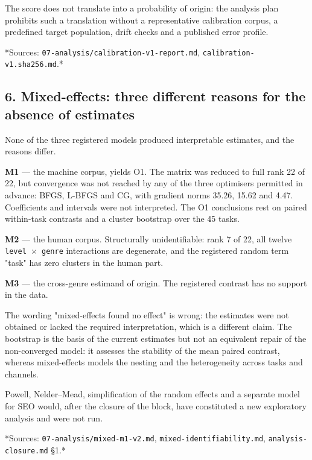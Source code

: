 \documentclass[11pt,a4paper]{article}
\renewcommand{\_}{\textunderscore\allowbreak}
\begin{document}
The score does not translate into a probability of origin: the analysis plan
prohibits such a translation without a representative calibration corpus, a
predefined target population, drift checks and a published error profile.

*Sources: \texttt{07-\allowbreak{}analysis/calibration-\allowbreak{}v1-\allowbreak{}report.md}, \texttt{calibration-\allowbreak{}v1.sha256.md}.*

\subsection{6. Mixed-effects: three different reasons for the absence of estimates}

None of the three registered models produced interpretable estimates, and the
reasons differ.

\textbf{M1} — the machine corpus, yields O1. The matrix was reduced to full rank 22
of 22, but convergence was not reached by any of the three optimisers
permitted in advance: BFGS, L-BFGS and CG, with gradient norms 35.26, 15.62
and 4.47. Coefficients and intervals were not interpreted. The O1 conclusions
rest on paired within-task contrasts and a cluster bootstrap over the 45
tasks.

\textbf{M2} — the human corpus. Structurally unidentifiable: rank 7 of 22, all
twelve \texttt{level $\times$ genre} interactions are degenerate, and the registered random
term "task" has zero clusters in the human part.

\textbf{M3} — the cross-genre estimand of origin. The registered contrast has no
support in the data.

The wording "mixed-effects found no effect" is wrong: the estimates were not
obtained or lacked the required interpretation, which is a different claim.
The bootstrap is the basis of the current estimates but not an equivalent
repair of the non-converged model: it assesses the stability of the mean
paired contrast, whereas mixed-effects models the nesting and the
heterogeneity across tasks and channels.

Powell, Nelder–Mead, simplification of the random effects and a separate model
for SEO would, after the closure of the block, have constituted a new
exploratory analysis and were not run.

*Sources: \texttt{07-\allowbreak{}analysis/mixed-\allowbreak{}m1-\allowbreak{}v2.md}, \texttt{mixed-\allowbreak{}identifiability.md},
\texttt{analysis-\allowbreak{}closure.md} §1.*
\end{document}
